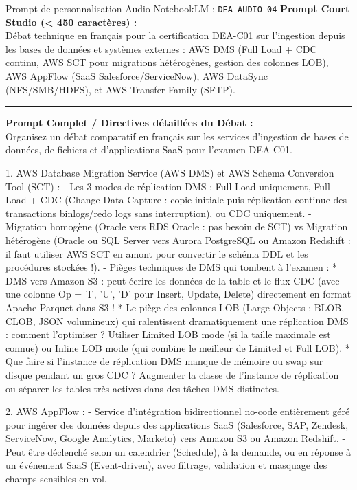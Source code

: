 \documentclass[11pt,a4paper]{article}
\begin{document}
\begin{promptbox}{Prompt de personnalisation Audio NotebookLM : \texttt{DEA-AUDIO-04}}
\textbf{Prompt Court Studio (< 450 caractères) :}\\
Débat technique en français pour la certification DEA-C01 sur l'ingestion depuis les bases de données et systèmes externes : AWS DMS (Full Load + CDC continu, AWS SCT pour migrations hétérogènes, gestion des colonnes LOB), AWS AppFlow (SaaS Salesforce/ServiceNow), AWS DataSync (NFS/SMB/HDFS), et AWS Transfer Family (SFTP).

\medskip\hrule\medskip
\textbf{Prompt Complet / Directives détaillées du Débat :}\\
Organisez un débat comparatif en français sur les services d'ingestion de bases de données, de fichiers et d'applications SaaS pour l'examen DEA-C01.

1. AWS Database Migration Service (AWS DMS) et AWS Schema Conversion Tool (SCT) :
- Les 3 modes de réplication DMS : Full Load uniquement, Full Load + CDC (Change Data Capture : copie initiale puis réplication continue des transactions binlogs/redo logs sans interruption), ou CDC uniquement.
- Migration homogène (Oracle vers RDS Oracle : pas besoin de SCT) vs Migration hétérogène (Oracle ou SQL Server vers Aurora PostgreSQL ou Amazon Redshift : il faut utiliser AWS SCT en amont pour convertir le schéma DDL et les procédures stockées !).
- Pièges techniques de DMS qui tombent à l'examen :
  * DMS vers Amazon S3 : peut écrire les données de la table et le flux CDC (avec une colonne Op = 'I', 'U', 'D' pour Insert, Update, Delete) directement en format Apache Parquet dans S3 !
  * Le piège des colonnes LOB (Large Objects : BLOB, CLOB, JSON volumineux) qui ralentissent dramatiquement une réplication DMS : comment l'optimiser ? Utiliser Limited LOB mode (si la taille maximale est connue) ou Inline LOB mode (qui combine le meilleur de Limited et Full LOB).
  * Que faire si l'instance de réplication DMS manque de mémoire ou swap sur disque pendant un gros CDC ? Augmenter la classe de l'instance de réplication ou séparer les tables très actives dans des tâches DMS distinctes.

2. AWS AppFlow :
- Service d'intégration bidirectionnel no-code entièrement géré pour ingérer des données depuis des applications SaaS (Salesforce, SAP, Zendesk, ServiceNow, Google Analytics, Marketo) vers Amazon S3 ou Amazon Redshift.
- Peut être déclenché selon un calendrier (Schedule), à la demande, ou en réponse à un événement SaaS (Event-driven), avec filtrage, validation et masquage des champs sensibles en vol.


\end{promptbox}
\end{document}
